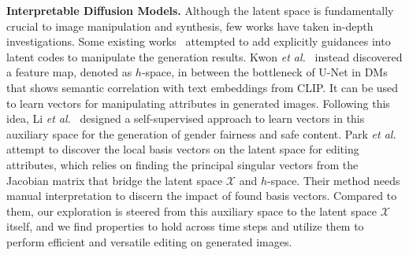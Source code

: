 \textbf{Interpretable Diffusion Models.} Although the latent space is fundamentally crucial to image manipulation and synthesis, few works have taken in-depth investigations. Some existing works~\cite{choi2021ilvr,meng2108sdedit} attempted to add explicitly guidances into latent codes to manipulate the generation results. Kwon \textit{et al.}~\cite{kwon2022diffusion} instead discovered a feature map, denoted as $h$-space, in between the bottleneck of U-Net in DMs that shows semantic correlation with text embeddings from CLIP. It can be used to learn vectors for manipulating attributes in generated images. Following this idea, Li \textit{et al.}~\cite{li2024self} designed a self-supervised approach to learn vectors in this auxiliary space for the generation of gender fairness and safe content. Park \textit{et al.}~\cite{park2023understanding} attempt to discover the local basis vectors on the latent space for editing attributes, which relies on finding the principal singular vectors from the Jacobian matrix that bridge the latent space $\mathcal{X}$ and $h$-space. Their method needs manual interpretation to discern the impact of found basis vectors. Compared to them, our exploration is steered from this auxiliary space to the latent space $\mathcal{X}$ itself, and we find properties to hold across time steps and utilize them to perform efficient and versatile editing on generated images.


